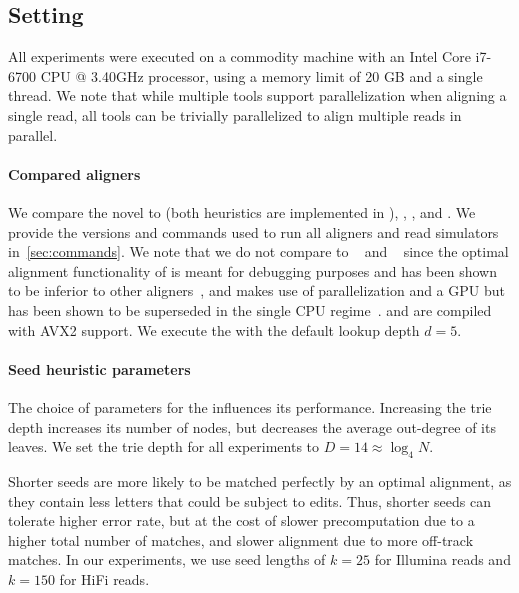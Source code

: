 \subsection{Setting}
%
All experiments were executed on a commodity machine with an Intel Core i7-6700
CPU @ 3.40GHz processor, using a memory limit of 20 GB and a single thread.
%
We note that while multiple tools support parallelization when aligning a single
read, all tools can be trivially parallelized to align multiple reads in
parallel.

\paragraph{Compared aligners}
%
We compare the novel \sh to \prefixh (both heuristics are implemented in
\astarix), \graphaligner, \pasgal, and \vargas. We provide the versions and
commands used to run all aligners and read simulators
in~\cref{sec:commands}. 
%
We note that we do not compare to \vg~\citep{garrison_variation_2018} and
\hga~\citep{feng2021accelerating} since the optimal alignment functionality of
\vg is meant for debugging purposes and has been shown to be inferior to other
aligners~\citep[Tab.~4]{feng2021accelerating}, and \hga makes use of
parallelization and a GPU but has been shown to be superseded in the single CPU
regime~\citep[Fig.~9]{feng2021accelerating}. \pasgal and \vargas are compiled
with AVX2 support. We execute the \prefixh with the default lookup depth $d=5$.

\paragraph{Seed heuristic parameters}
%
The choice of parameters for the \sh influences its performance.
%
Increasing the trie depth increases its number of nodes, but decreases the
average out-degree of its leaves. We set the trie depth for all experiments to
$D=14 \approx \log_4 N$.

Shorter seeds are more likely to be matched perfectly by an optimal alignment,
as they contain less letters that could be subject to edits. Thus, shorter seeds
can tolerate higher error rate, but at the cost of slower precomputation due to
a higher total number of matches, and slower alignment due to more off-track
matches.
%
In our experiments, we use seed lengths of $k=25$ for Illumina reads and $k=150$
for HiFi reads.

